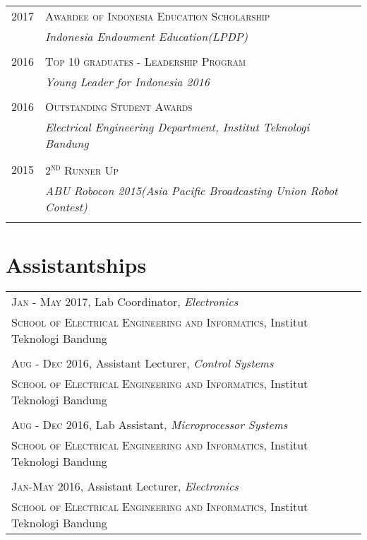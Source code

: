 \documentclass[a4paper,10pt]{article} %
\begin{document}
\begin{tabular}{r|p{12cm}}
\textsc{2017} & \textsc{Awardee of Indonesia Education Scholarship}\\
& \emph{Indonesia Endowment Education(LPDP)}\\ 
\multicolumn{2}{c}{} \\

\textsc{2016} & \textsc{Top 10 graduates - Leadership Program}\\
& \emph{Young Leader for Indonesia 2016}\\ 
\multicolumn{2}{c}{} \\

\textsc{2016} & \textsc{Outstanding Student Awards}\\
& \emph{Electrical Engineering Department, Institut Teknologi Bandung}\\ 
\multicolumn{2}{c}{} \\

\textsc{2015} & \textsc{2\textsuperscript{nd} Runner Up}\\
& \emph{ABU Robocon 2015(Asia Pacific Broadcasting Union Robot Contest)}\\ 
\multicolumn{2}{c}{} \\

\end{tabular}

\vspace{-3mm}
\section{Assistantships}

\begin{tabular}{l}

\textsc{Jan - May 2017}, Lab Coordinator, \textit{Electronics}\\
\textsc{School of Electrical Engineering and Informatics}, Institut Teknologi Bandung\\ 
\\
\textsc{Aug - Dec 2016}, Assistant Lecturer, \textit{Control Systems}\\
\textsc{School of Electrical Engineering and Informatics}, Institut Teknologi Bandung\\ 
\\
\textsc{Aug - Dec 2016}, Lab Assistant, \textit{Microprocessor Systems}\\
\textsc{School of Electrical Engineering and Informatics}, Institut Teknologi Bandung\\ 
\\
\textsc{Jan-May 2016}, Assistant Lecturer, \textit{Electronics}\\
\textsc{School of Electrical Engineering and Informatics}, Institut Teknologi Bandung\\ 

\end{tabular}
\end{document}
